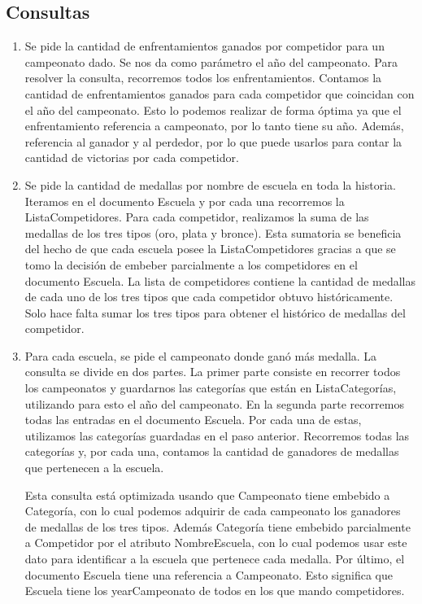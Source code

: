 \subsection{Consultas}
\begin{enumerate}
  \item Se pide la cantidad de enfrentamientos ganados por competidor para un campeonato dado. Se nos da como parámetro
  el año del campeonato. Para resolver la consulta, recorremos todos los enfrentamientos. Contamos la cantidad de
  enfrentamientos ganados para cada competidor que coincidan con el año del campeonato. Esto lo podemos realizar de forma óptima
  ya que el enfrentamiento referencia a campeonato, por lo tanto tiene su año. Además, referencia al ganador y al
  perdedor, por lo que puede usarlos para contar la cantidad de victorias por cada competidor.

  \item Se pide la cantidad de medallas por nombre de escuela en toda la historia. Iteramos en el documento Escuela y por cada una
  recorremos la ListaCompetidores. Para cada competidor, realizamos la suma de las medallas de los tres tipos (oro, plata y bronce).
  Esta sumatoria se beneficia del hecho de que cada escuela posee la ListaCompetidores gracias a que se tomo la decisión de embeber parcialmente a los competidores en el documento Escuela. La lista de competidores contiene la cantidad de medallas de cada uno de los tres tipos que cada competidor obtuvo
  históricamente. Solo hace falta sumar los tres tipos para obtener el histórico de medallas del competidor.

  \item Para cada escuela, se pide el campeonato donde ganó más medalla. La consulta se divide en dos partes. La primer parte consiste
  en recorrer todos los campeonatos y guardarnos las categorías que están en ListaCategorías, utilizando para esto el año del
  campeonato. En la segunda parte recorremos todas las entradas en el documento Escuela. Por cada una de estas, utilizamos las
  categorías guardadas en el paso anterior. Recorremos todas las categorías y, por cada una, contamos la cantidad de ganadores de
  medallas que pertenecen a la escuela.
  
  Esta consulta está optimizada usando que Campeonato tiene embebido a Categoría, con lo
  cual podemos adquirir de cada campeonato los ganadores de medallas de los tres tipos. Además Categoría tiene embebido parcialmente
  a Competidor por el atributo NombreEscuela, con lo cual podemos usar este dato para identificar a la escuela que pertenece cada
  medalla. Por último, el documento Escuela tiene una referencia a Campeonato. Esto significa que Escuela tiene los yearCampeonato
  de todos en los que mando competidores.
  

\end{enumerate}
